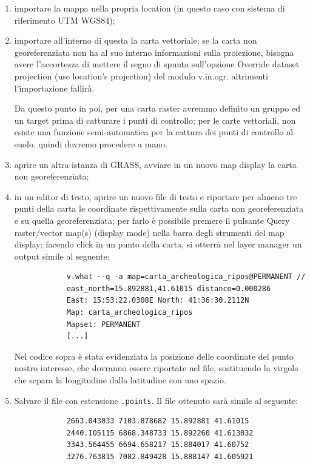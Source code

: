	\begin{enumerate}
		\item importare la mappa nella propria location (in questo caso con sistema di riferimento UTM WGS84);
		\item importare all'interno di questa la carta vettoriale; se la carta non georeferenziata non ha al suo interno informazioni sulla proiezione, bisogna avere l'accortezza di mettere il segno di spunta sull'opzione \textsf{Override dataset projection (use location's projection)} del modulo \textsf{v.in.ogr}. altrimenti l'importazione fallirà.

		Da questo punto in poi, per una carta raster avremmo definito un gruppo ed un target prima di catturare i punti di controllo; per le carte vettoriali, non esiste una funzione semi-automatica per la cattura dei punti di controllo al suolo, quindi dovremo procedere a mano.

		\item aprire un altra istanza di GRASS, avviare in un nuovo map display la carta non georeferenziata;
		
		\item in un editor di testo, aprire un nuovo file di testo e riportare per almeno tre punti della carta le coordinate rispettivamente sulla carta non georeferenziata e su quella georeferenziata; per farlo è possibile premere il pulsante \textsf{Query raster/vector map(s) (display mode)} nella barra degli strumenti del map display; facendo click in un punto della carta, si otterrà nel layer manager un output simile al seguente:

		\begin{Verbatim}
			v.what --q -a map=carta_archeologica_ripos@PERMANENT //
			east_north=15.892881,41.61015 distance=0.000286
			East: 15:53:22.0308E North: 41:36:30.2112N
			Map: carta_archeologica_ripos
			Mapset: PERMANENT
			[...]
		\end{Verbatim}
		
		Nel codice sopra è stata evidenziata la posizione delle coordinate del punto nostro interesse, che dovranno essere riportate nel file, sostituendo la virgola che separa la longitudine dalla latitudine con uno spazio.

		\item Salvare il file con estensione \texttt{.points}. Il file ottenuto sarà simile al seguente:

		\begin{Verbatim}
			2663.043033 7103.878682 15.892881 41.61015
			2440.105115 6868.348733 15.892260 41.613032
			3343.564455 6694.658217 15.884017 41.60752
			3276.763815 7082.849428 15.888147 41.605921
		\end{Verbatim}
		

\end{enumerate}
